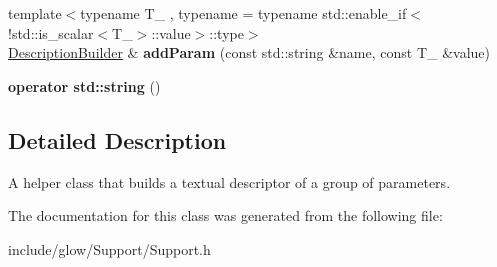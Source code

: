 \begin{DoxyCompactItemize}
{\footnotesize template$<$typename T\+\_\+ , typename  = typename std\+::enable\+\_\+if$<$                             !std\+::is\+\_\+scalar$<$\+T\+\_\+$>$\+::value$>$\+::type$>$ }\\\hyperlink{classglow_1_1_description_builder}{Description\+Builder} \& {\bfseries add\+Param} (const std\+::string \&name, const T\+\_\+ \&value)
\item 
\mbox{\label{classglow_1_1_description_builder_a469e25f488e5d092bf3127583828545d}} 
{\bfseries operator std\+::string} ()
\end{DoxyCompactItemize}


\subsection{Detailed Description}
A helper class that builds a textual descriptor of a group of parameters. 

The documentation for this class was generated from the following file\+:\begin{DoxyCompactItemize}
\item 
include/glow/\+Support/Support.\+h\end{DoxyCompactItemize}
